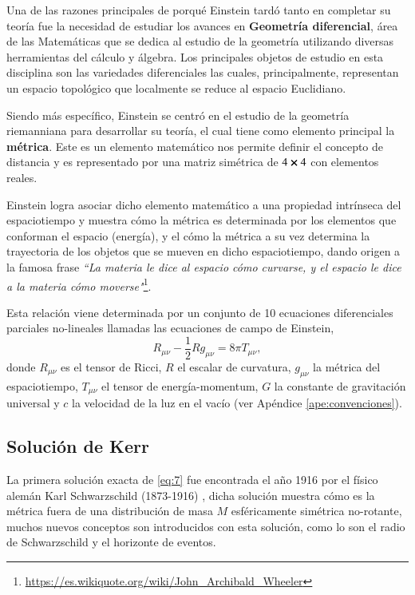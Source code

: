 Una de las razones principales de porqué Einstein tardó tanto en completar su teoría fue la necesidad de estudiar los avances en \textbf{Geometría diferencial}, área de las Matemáticas que se dedica al estudio de la geometría utilizando diversas herramientas del cálculo y álgebra. Los principales objetos de estudio en esta disciplina son las variedades diferenciales las cuales, principalmente, representan un espacio topológico que localmente se reduce al espacio Euclidiano.

Siendo más específico, Einstein se centró en el estudio de la geometría riemanniana para desarrollar su teoría, el cual tiene como elemento principal la \textbf{métrica}. Este es un elemento matemático nos permite definir el concepto de distancia y es representado por una matriz simétrica de $4 \cross 4$ con elementos reales.

Einstein logra asociar dicho elemento matemático a una propiedad intrínseca del espaciotiempo y muestra cómo la métrica es determinada por los elementos que conforman el espacio (energía), y el cómo la métrica a su vez determina la trayectoria de los objetos que se mueven en dicho espaciotiempo, dando origen a la famosa frase \textit{``La materia le dice al espacio cómo curvarse, y el espacio le dice a la materia cómo moverse"}\footnote{\url{https://es.wikiquote.org/wiki/John_Archibald_Wheeler}}.

Esta relación viene determinada por un conjunto de 10 ecuaciones diferenciales parciales no-lineales llamadas las ecuaciones de campo de Einstein,
\begin{equation}
\label{eq:7}
R_{\mu \nu} - \frac{1}{2}R g_{\mu \nu} = 8\pi  T_{\mu \nu},
\end{equation}
donde $R_{\mu \nu}$ es el tensor de Ricci, $R$ el escalar de curvatura, $g_{\mu \nu}$ la métrica del espaciotiempo, $T_{\mu \nu}$ el tensor de energía-momentum, $G$ la constante de gravitación universal y $c$ la velocidad de la luz en el vacío (ver Apéndice \ref{ape:convenciones}).

\subsection{Solución de Kerr}

La primera solución exacta de \eqref{eq:7} fue encontrada el año 1916 por el físico alemán Karl Schwarzschild (1873-1916) \cite{Heinicke}, dicha solución muestra cómo es la métrica fuera de una distribución de masa $M$ esféricamente simétrica no-rotante, muchos nuevos conceptos son introducidos con esta solución, como lo son el radio de Schwarzschild y el horizonte de eventos.

